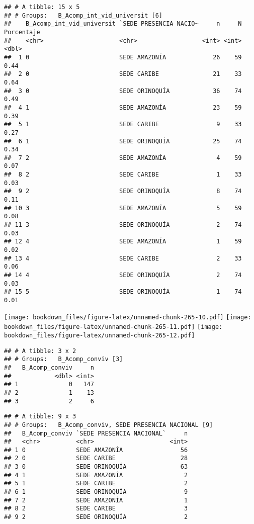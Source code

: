 \documentclass[]{article}
\theoremstyle{definition}
\theoremstyle{definition}
\theoremstyle{definition}
\theoremstyle{remark}
\begin{document}
\begin{verbatim}
## # A tibble: 15 x 5
## # Groups:   B_Acomp_int_vid_universit [6]
##    B_Acomp_int_vid_universit `SEDE PRESENCIA NACIO~     n     N Porcentaje
##    <chr>                     <chr>                  <int> <int>      <dbl>
##  1 0                         SEDE AMAZONÍA             26    59       0.44
##  2 0                         SEDE CARIBE               21    33       0.64
##  3 0                         SEDE ORINOQUÍA            36    74       0.49
##  4 1                         SEDE AMAZONÍA             23    59       0.39
##  5 1                         SEDE CARIBE                9    33       0.27
##  6 1                         SEDE ORINOQUÍA            25    74       0.34
##  7 2                         SEDE AMAZONÍA              4    59       0.07
##  8 2                         SEDE CARIBE                1    33       0.03
##  9 2                         SEDE ORINOQUÍA             8    74       0.11
## 10 3                         SEDE AMAZONÍA              5    59       0.08
## 11 3                         SEDE ORINOQUÍA             2    74       0.03
## 12 4                         SEDE AMAZONÍA              1    59       0.02
## 13 4                         SEDE CARIBE                2    33       0.06
## 14 4                         SEDE ORINOQUÍA             2    74       0.03
## 15 5                         SEDE ORINOQUÍA             1    74       0.01
\end{verbatim}

\texttt{[image: bookdown\_files/figure-latex/unnamed-chunk-265-10.pdf]}
\texttt{[image: bookdown\_files/figure-latex/unnamed-chunk-265-11.pdf]}
\texttt{[image: bookdown\_files/figure-latex/unnamed-chunk-265-12.pdf]}

\begin{verbatim}
## # A tibble: 3 x 2
## # Groups:   B_Acomp_conviv [3]
##   B_Acomp_conviv     n
##            <dbl> <int>
## 1              0   147
## 2              1    13
## 3              2     6
\end{verbatim}

\begin{verbatim}
## # A tibble: 9 x 3
## # Groups:   B_Acomp_conviv, SEDE PRESENCIA NACIONAL [9]
##   B_Acomp_conviv `SEDE PRESENCIA NACIONAL`     n
##   <chr>          <chr>                     <int>
## 1 0              SEDE AMAZONÍA                56
## 2 0              SEDE CARIBE                  28
## 3 0              SEDE ORINOQUÍA               63
## 4 1              SEDE AMAZONÍA                 2
## 5 1              SEDE CARIBE                   2
## 6 1              SEDE ORINOQUÍA                9
## 7 2              SEDE AMAZONÍA                 1
## 8 2              SEDE CARIBE                   3
## 9 2              SEDE ORINOQUÍA                2
\end{verbatim}
\end{document}
